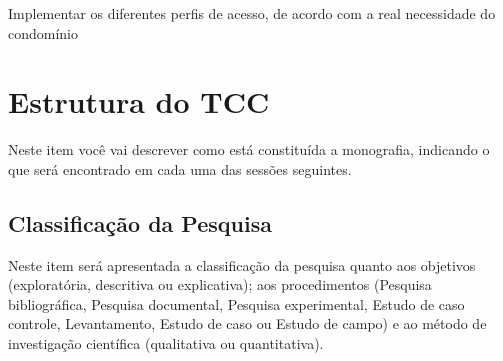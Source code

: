 Implementar os diferentes perfis de acesso, de acordo com a real necessidade
do condomínio

\section{Estrutura do TCC}
Neste item você vai descrever como está constituída a monografia, indicando o
que será encontrado em cada uma das sessões seguintes.

\subsection{Classificação da Pesquisa}
Neste item será apresentada a classificação da pesquisa quanto aos objetivos
(exploratória, descritiva ou explicativa); aos procedimentos (Pesquisa
bibliográfica, Pesquisa documental, Pesquisa experimental, Estudo de caso
controle, Levantamento, Estudo de caso ou Estudo de campo) e ao método de
investigação científica (qualitativa ou quantitativa).
